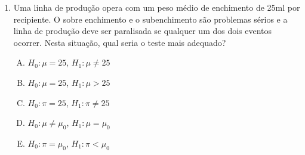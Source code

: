 \documentclass[12pt, a4paper]{article}
\begin{document}
\begin{enumerate}
\item Uma linha de produção opera com um peso médio de enchimento de 25ml por recipiente. O sobre enchimento e o subenchimento são problemas sérios e a linha de produção deve ser paralisada se qualquer um dos dois eventos ocorrer. Nesta situação, qual seria o teste mais adequado?
\begin{enumerate}[A)]
    \item $H_0: \mu=25$, $H_1: \mu \neq 25$
    \item $H_0: \mu=25$, $H_1: \mu > 25$
    \item $H_0: \pi=25$, $H_1: \pi \neq 25$
    \item $H_0: \mu \neq \mu_{0}$, $H_1: \mu = \mu_{0}$
    \item $H_0: \pi = \mu_{0}$, $H_1: \pi < \mu_{0}$
\end{enumerate}


\end{enumerate}
\end{document}
